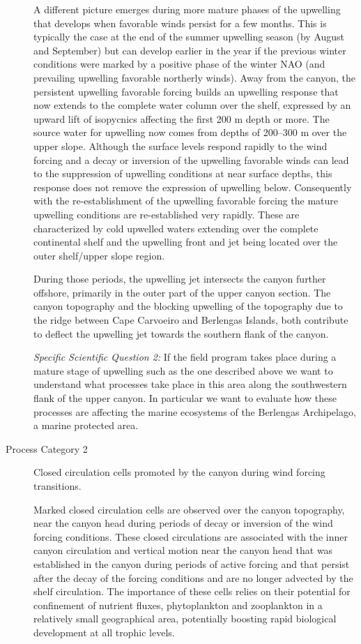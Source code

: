 \begin{description}
A different picture emerges during more mature phases of the upwelling
that develops when favorable winds persist for a few months. This is
typically the case at the end of the summer upwelling season (by
August and September) but can develop earlier in the year if the
previous winter conditions were marked by a positive phase of the
winter NAO (and prevailing upwelling favorable northerly winds). Away
from the canyon, the persistent upwelling favorable forcing builds an
upwelling response that now extends to the complete water column over
the shelf, expressed by an upward lift of isopycnics affecting the
first 200 m depth or more. The source water for upwelling now comes
from depths of 200--300 m over the upper slope. Although the surface
levels respond rapidly to the wind forcing and a decay or inversion of
the upwelling favorable winds can lead to the suppression of upwelling
conditions at near surface depths, this response does not remove the
expression of upwelling below. Consequently with the re-establishment
of the upwelling favorable forcing the mature upwelling conditions are
re-established very rapidly. These are characterized by cold upwelled
waters extending over the complete continental shelf and the upwelling
front and jet being located over the outer shelf/upper slope region.

During those periods, the upwelling jet intersects the \naz canyon
further offshore, primarily in the outer part of the upper canyon
section. The canyon topography and the blocking upwelling of the
topography due to the ridge between Cape Carvoeiro and Berlengas
Islands, both contribute to deflect the upwelling jet towards the
southern flank of the canyon. 
 
\textsl{Specific Scientific Question 2:} If the \proj field program
takes place during a mature stage of upwelling such as the one
described above we want to understand what processes take place in
this area along the southwestern flank of the upper \naz canyon. In
particular we want to evaluate how these processes are affecting the
marine ecosystems of the Berlengas Archipelago, a marine protected
area.

\item[Process Category 2] Closed circulation cells promoted by the
canyon during wind forcing transitions.

Marked closed circulation cells are observed over the canyon
topography, near the canyon head during periods of decay or inversion
of the wind forcing conditions. These closed circulations are
associated with the inner canyon circulation and vertical motion near
the canyon head that was established in the canyon during periods
of active forcing and that persist after the decay of the forcing
conditions and are no longer advected by the shelf circulation. The
importance of these cells relies on their potential for confinement of
nutrient fluxes, phytoplankton and zooplankton in a relatively small
geographical area, potentially boosting rapid biological development
at all trophic levels.


\end{description}
